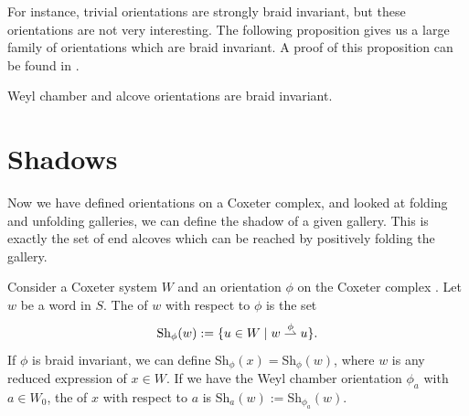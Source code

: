 \documentclass[11pt]{article}
\begin{document}
For instance, trivial orientations are strongly braid invariant, but these orientations are not very interesting. The following proposition gives us a large family of orientations which are braid invariant. A proof of this proposition can be found in \cite[pp.135-138]{SHA}.

\begin{proposition}
    Weyl chamber and alcove orientations are braid invariant.
\end{proposition}


\section{Shadows}\label{8}
Now we have defined orientations on a Coxeter complex, and looked at folding and unfolding galleries, we can define the shadow of a given gallery. This is exactly the set of end alcoves which can be reached by positively folding the gallery. 


\begin{definition}
    Consider a Coxeter system $W$ and an orientation $\phi$ on the Coxeter complex \sg\W. Let $w$ be a word in $S$. The  of $w$ with respect to $\phi$ is the set 
    \[\textnormal{Sh}_\phi(w):=\{u\in W\mid w\stackrel{\phi}{\rightharpoonup} u\}.\]
    If $\phi$ is braid invariant, we can define Sh$_\phi(x)=$Sh$_\phi(w)$, where $w$ is any reduced expression of $x\in W$. If we have the Weyl chamber orientation $\phi_a$ with $a\in W_0$, the  of $x$ with respect to $a$ is Sh$_a(w):=$Sh$_{\phi_a}(w)$. %
\end{definition}
\end{document}
